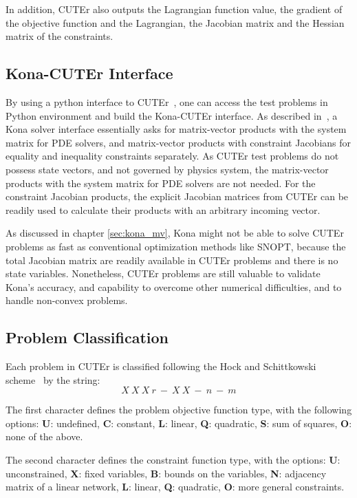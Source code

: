In addition, CUTEr also outputs the Lagrangian function value, the gradient of the objective function and the Lagrangian, the Jacobian matrix and the Hessian matrix of the constraints. 

\subsection{Kona-CUTEr Interface}
By using a python interface to CUTEr~\cite{cuter_python}, one can access the test problems in Python environment and build the Kona-CUTEr interface. As described in~\cite{dener:scitech2016}, a Kona solver interface essentially asks for matrix-vector products with the system matrix for PDE solvers, and matrix-vector products with constraint Jacobians for equality and inequality constraints separately. As CUTEr test problems do not possess state vectors, and not governed by physics system, the matrix-vector products with the system matrix for PDE solvers are not needed. For the constraint Jacobian products, the explicit Jacobian matrices from CUTEr can be readily used to calculate their products with an arbitrary incoming vector. 

As discussed in chapter \ref{sec:kona_mv}, Kona might not be able to solve CUTEr problems as fast as conventional optimization methods like SNOPT, because the total Jacobian matrix are readily available in CUTEr problems and there is no state variables.  Nonetheless, CUTEr problems are still valuable to validate Kona's accuracy, and capability to overcome other numerical difficulties, and to handle non-convex problems. 

\subsection{Problem Classification}
Each problem in CUTEr is classified following the Hock and Schittkowski scheme~\cite{cuterScheme} by the string: 
\begin{equation*}
X \ X \ X \ r \ - \ X \ X \ - \ n \ - \ m
\end{equation*}

The first character defines the problem objective function type, with the following options: 
\textbf{U}: undefined, \textbf{C}: constant, \textbf{L}: linear, \textbf{Q}: quadratic, \textbf{S}: sum of squares, \textbf{O}: none of the above. 

The second character defines the constraint function type, with the options: 
\textbf{U}: unconstrained, \textbf{X}: fixed variables, \textbf{B}: bounds on the variables, \textbf{N}: adjacency matrix of a linear network, \textbf{L}: linear, \textbf{Q}: quadratic, \textbf{O}: more general constraints. 

